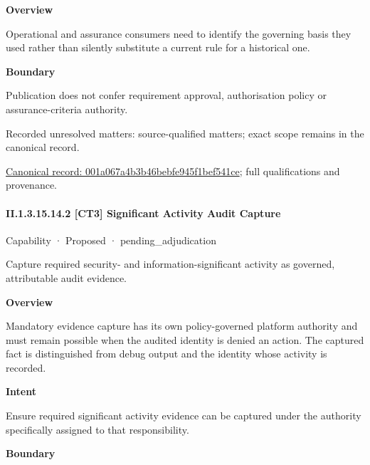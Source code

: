 \textbf{Overview}



Operational and assurance consumers need to identify the governing basis they used rather than silently substitute a current rule for a historical one.



\textbf{Boundary}



Publication does not confer requirement approval, authorisation policy or assurance-criteria authority.


{\small Recorded unresolved matters: source-qualified matters; exact scope remains in the canonical record.}\par
{\footnotesize \href{../../../../continuum/strategy/capability/feature/001a067a4b3b46bebfe945f1bef541ce.md}{Canonical record: 001a067a4b3b46bebfe945f1bef541ce}; full qualifications and provenance.}\par
\paragraph*{II.1.3.15.14.2 [CT3] Significant Activity Audit Capture}
\label{navigation:II.1.3.15.14.2}

\label{element:d903948169eb4785b0f03d916c842a8a}
{\small Capability · Proposed · pending\_adjudication}\par

Capture required security- and information-significant activity as governed, attributable audit evidence.



\textbf{Overview}



Mandatory evidence capture has its own policy-governed platform authority and must remain possible when the audited identity is denied an action. The captured fact is distinguished from debug output and the identity whose activity is recorded.



\textbf{Intent}



Ensure required significant activity evidence can be captured under the authority specifically assigned to that responsibility.



\textbf{Boundary}



